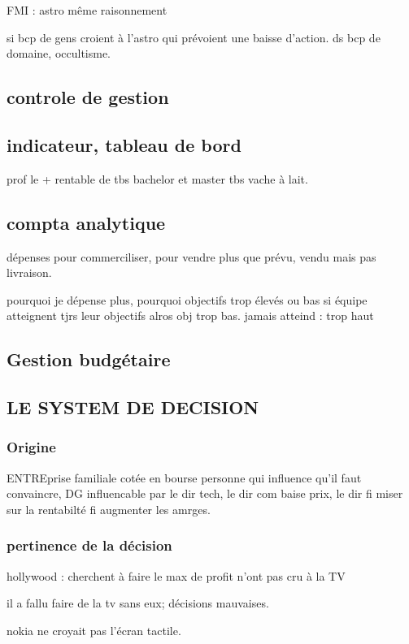 \documentclass[a4paper,12pt]{article}
\begin{document}
FMI : astro même raisonnement

si bcp de gens croient à l'astro qui prévoient une baisse d'action.
ds bcp de domaine, occultisme.


\subsection{controle de gestion}


\subsection{indicateur, tableau de bord}
prof le + rentable de tbs bachelor et master tbs vache à lait.

\subsection{compta analytique}
dépenses pour commerciliser, pour vendre plus que prévu, vendu mais pas livraison.

pourquoi je dépense plus, pourquoi objectifs trop élevés ou bas
si équipe atteignent tjrs leur objectifs alros obj trop bas.
jamais atteind : trop haut
\subsection{Gestion budgétaire}

 \subsection{LE SYSTEM DE DECISION}
 
 
 \subsubsection{Origine}
 ENTREprise familiale cotée en bourse
 personne qui influence qu'il faut convaincre, DG influencable par le dir tech, le dir com baise prix,
 le dir fi miser sur la rentabilté fi augmenter les amrges.
 
 \subsubsection{pertinence de la décision} 
 hollywood : cherchent à faire le max de profit
 n'ont pas cru à la TV
 
 il a fallu faire de la tv sans eux; décisions mauvaises.
 
 nokia ne croyait pas l'écran tactile.
 
\end{document}
